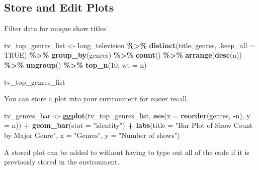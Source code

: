 \documentclass[
]{book}
\newenvironment{Shaded}{\begin{snugshade}}{\end{snugshade}}
\newcommand{\AttributeTok}[1]{\textcolor[rgb]{0.13,0.29,0.53}{#1}}
\newcommand{\ConstantTok}[1]{\textcolor[rgb]{0.56,0.35,0.01}{#1}}
\newcommand{\DecValTok}[1]{\textcolor[rgb]{0.00,0.00,0.81}{#1}}
\newcommand{\FunctionTok}[1]{\textcolor[rgb]{0.13,0.29,0.53}{\textbf{#1}}}
\newcommand{\NormalTok}[1]{#1}
\newcommand{\OtherTok}[1]{\textcolor[rgb]{0.56,0.35,0.01}{#1}}
\newcommand{\SpecialCharTok}[1]{\textcolor[rgb]{0.81,0.36,0.00}{\textbf{#1}}}
\newcommand{\StringTok}[1]{\textcolor[rgb]{0.31,0.60,0.02}{#1}}
\begin{document}
\subsection*{Store and Edit Plots}\label{store-and-edit-plots}

Filter data for unique show titles

\begin{Shaded}
\begin{Highlighting}[]
\NormalTok{tv\_top\_genres\_list }\OtherTok{\textless{}{-}}\NormalTok{ long\_television }\SpecialCharTok{\%\textgreater{}\%}
  \FunctionTok{distinct}\NormalTok{(title, genres, }\AttributeTok{.keep\_all =} \ConstantTok{TRUE}\NormalTok{) }\SpecialCharTok{\%\textgreater{}\%}
  \FunctionTok{group\_by}\NormalTok{(genres) }\SpecialCharTok{\%\textgreater{}\%}
  \FunctionTok{count}\NormalTok{() }\SpecialCharTok{\%\textgreater{}\%}
  \FunctionTok{arrange}\NormalTok{(}\FunctionTok{desc}\NormalTok{(n)) }\SpecialCharTok{\%\textgreater{}\%}
  \FunctionTok{ungroup}\NormalTok{() }\SpecialCharTok{\%\textgreater{}\%}
  \FunctionTok{top\_n}\NormalTok{(}\DecValTok{10}\NormalTok{, }\AttributeTok{wt =}\NormalTok{ n)}

\NormalTok{tv\_top\_genres\_list}
\end{Highlighting}
\end{Shaded}

You can store a plot into your environment for easier recall.

\begin{Shaded}
\begin{Highlighting}[]
\NormalTok{tv\_genres\_bar }\OtherTok{\textless{}{-}} \FunctionTok{ggplot}\NormalTok{(tv\_top\_genres\_list, }\FunctionTok{aes}\NormalTok{(}\AttributeTok{x =} \FunctionTok{reorder}\NormalTok{(genres, }\SpecialCharTok{{-}}\NormalTok{n), }\AttributeTok{y =}\NormalTok{ n)) }\SpecialCharTok{+}
  \FunctionTok{geom\_bar}\NormalTok{(}\AttributeTok{stat =} \StringTok{"identity"}\NormalTok{) }\SpecialCharTok{+}
  \FunctionTok{labs}\NormalTok{(}\AttributeTok{title =} \StringTok{"Bar Plot of Show Count by Major Genre"}\NormalTok{,}
       \AttributeTok{x =} \StringTok{"Genres"}\NormalTok{,}
       \AttributeTok{y =} \StringTok{"Number of shows"}\NormalTok{)}
\end{Highlighting}
\end{Shaded}

A stored plot can be added to without having to type out all of the code if it is previously stored in the environment.
\end{document}

